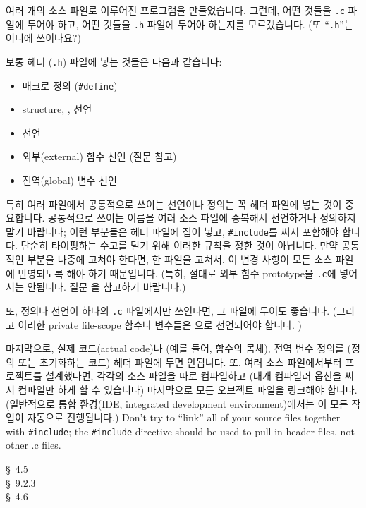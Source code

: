 \begin{faq}
	여러 개의 소스 파일로 이루어진 프로그램을 만들었습니다.
	그런데, 어떤 것들을 \verb+.c+ 파일에 두어야 하고, 어떤 것들을
	\verb+.h+ 파일에 두어야 하는지를 모르겠습니다.  (또 ``\verb+.h+''는
	어디에 쓰이나요?)

\A	보통 헤더 (\verb+.h+) 파일에 넣는 것들은 다음과 같습니다:

\begin{itemize}
\item 매크로 정의 (\verb+#define+)
\item structure, ,  선언
\item {} 선언
\item 외부(external) 함수 선언 (질문  참고)
\item 전역(global) 변수 선언
\end{itemize}
	특히 여러 파일에서 공통적으로 쓰이는 선언이나 정의는 꼭 헤더 파일에
	넣는 것이 중요합니다. 공통적으로 쓰이는 이름을 여러 소스
        파일에 중복해서 선언하거나 정의하지 말기 바랍니다; 이런 부분들은
        헤더 파일에 집어 넣고, \verb+#include+를 써서 포함해야 합니다.
        단순히 타이핑하는 수고를 덜기 위해 이러한 규칙을 정한 것이 아닙니다.
        만약 공통적인 부분을 나중에 고쳐야 한다면, 한 파일을 고쳐서, 이 변경
        사항이 모든 소스 파일에 반영되도록 해야 하기 때문입니다.
        (특히, 절대로 외부 함수 prototype을
	\verb+.c+에 넣어서는 안됩니다.  질문 을 참고하기 바랍니다.)

	또, 정의나 선언이 하나의 \verb+.c+ 파일에서만 쓰인다면, 그 파일에
	두어도 좋습니다. (그리고 이러한 private file-scope 함수나 변수들은
        으로 선언되어야 합니다. )

        마지막으로, 실제 코드(actual code)나 (예를 들어, 함수의 몸체),
        전역 변수 정의를 (정의 또는 초기화하는 코드) 헤더 파일에 두면 안됩니다.
        또, 여러 소스 파일에서부터 프로젝트를 설계했다면, 각각의 소스 파일을
        따로 컴파일하고 (대개 컴파일러 옵션을 써서 컴파일만 하게 할 수 있습니다)
        마지막으로 모든 오브젝트 파일을 링크해야 합니다. (일반적으로
        통합 환경(IDE, integrated development environment)에서는 이 모든 작업이
        자동으로 진행됩니다.)
        Don't try to ``link'' all of your source files together with
        \verb+#include+; the \verb+#include+ directive should be used
        to pull in header files, not other .c files.

\R
	\cite{kr2} \S\ 4.5  \\
	\cite{hs} \S\ 9.2.3  \\
	\cite{ctp} \S\ 4.6 
\end{faq}

